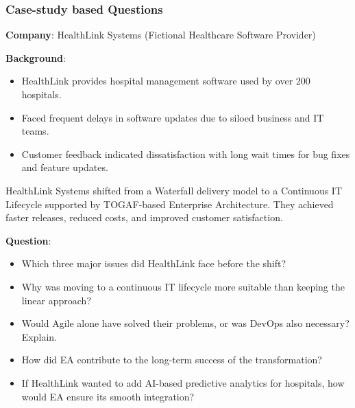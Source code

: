 \subsubsection{Case-study based Questions}

\noindent\textbf{Company}: HealthLink Systems (Fictional Healthcare Software Provider)

\noindent\textbf{Background}:
\begin{itemize}
    \item HealthLink provides hospital management software used by over 200 hospitals.
    \item Faced frequent delays in software updates due to siloed business and IT teams.
    \item Customer feedback indicated dissatisfaction with long wait times for bug fixes and feature updates.
\end{itemize}

HealthLink Systems shifted from a Waterfall delivery model to a Continuous IT Lifecycle supported by TOGAF-based Enterprise Architecture. They achieved faster releases, reduced costs, and improved customer satisfaction.

\bigskip

\noindent\textbf{Question}:

\begin{itemize}
    \item Which three major issues did HealthLink face before the shift?
    \item Why was moving to a continuous IT lifecycle more suitable than keeping the linear approach?
    \item Would Agile alone have solved their problems, or was DevOps also necessary? Explain.
    \item How did EA contribute to the long-term success of the transformation?
    \item If HealthLink wanted to add AI-based predictive analytics for hospitals, how would EA ensure its smooth integration?
\end{itemize}